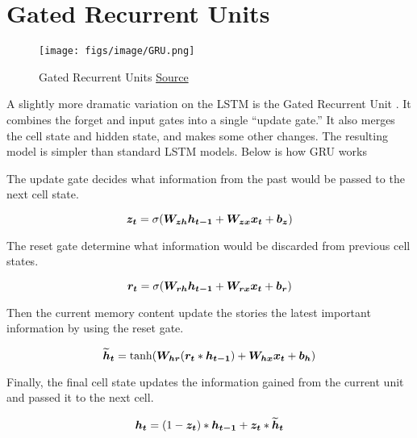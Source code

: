 \section{Gated Recurrent Units}

\begin{figure}[h]
  \centering
      \texttt{[image: figs/image/GRU.png]}
          \caption{
            Gated Recurrent Units
            \href{http://colah.github.io/posts/2015-08-Understanding-LSTMs/}{Source}
          }
          \label{fig:gru}
\end{figure}

A slightly more dramatic variation on the LSTM is the Gated Recurrent Unit \cite{1406.1078}.
It combines the forget and input gates into a single “update gate.” 
It also merges the cell state and hidden state, and makes some other changes. 
The resulting model is simpler than standard LSTM models.
Below is how GRU works

The update gate decides what information from the past would be passed to the next cell state.

\[\vect{z_t} = \sigma(\matr{W_{zh}}\vect{h_{t-1}}+\matr{W_{zx}}\vect{x_t} + \vect{b_z}) \]

The reset gate determine what information would be discarded from previous cell states.

\[\vect{r_t} = \sigma(\matr{W_{rh}}\vect{h_{t-1}}+\matr{W_{rx}}\vect{x_t} + \vect{b_r}) \]

Then the current memory content update the stories the latest important information by using the reset gate.

\[\vect{\widetilde{h}_t} = \tanh(\matr{W_{hr}}(\vect{r_t}*\vect{h_{t-1}}) + \matr{W_{hx}}\vect{x_t} + \vect{b_h})\]

Finally, the final cell state updates the information gained from the current unit and passed it to the next cell.

\[\vect{h_t} = (1-\vect{z_t})*\vect{h_{t-1}} + \vect{z_t}*\vect{\widetilde{h}_t}\]
